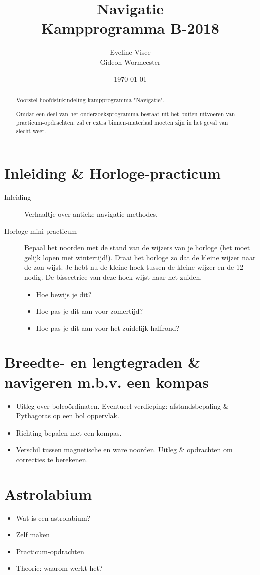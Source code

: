 \documentclass[a4paper,10pt]{article}
\title{Navigatie \\ Kampprogramma B-2018}
\author{Eveline Visee \\ Gideon Wormeester}
\date{\today}
\begin{document}
\maketitle

\begin{abstract}
Voorstel hoofdstukindeling kampprogramma "Navigatie".

Omdat een deel van het onderzoeksprogramma bestaat uit het buiten uitvoeren van practicum-opdrachten, zal er extra binnen-materiaal moeten zijn in het geval van slecht weer.
\end{abstract}

\section{Inleiding \& Horloge-practicum} \label{horloge}
\begin{description}
 \item [Inleiding] Verhaaltje over antieke navigatie-methodes.
 \item [Horloge mini-practicum] Bepaal het noorden met de stand van de wijzers van je horloge (het moet gelijk lopen met wintertijd!). Draai het horloge zo dat de kleine wijzer naar de zon wijst. Je hebt nu de kleine hoek tussen de kleine wijzer en de 12 nodig. De bissectrice van deze hoek wijst naar het zuiden. 
 \begin{itemize}
  \item Hoe bewijs je dit?
  \item Hoe pas je dit aan voor zomertijd?
  \item Hoe pas je dit aan voor het zuidelijk halfrond?
 \end{itemize}
\end{description}

\section{Breedte- en lengtegraden \& navigeren m.b.v. een kompas} \label{bol}
\begin{itemize}
 \item Uitleg over bolco\"ordinaten. Eventueel verdieping: afstandsbepaling \& Pythagoras op een bol oppervlak.
 \item Richting bepalen met een kompas.
 \item Verschil tussen magnetische en ware noorden. Uitleg \& opdrachten om correcties te berekenen.
\end{itemize}

\section{Astrolabium} \label{astrolabium}
\begin{itemize}
\item Wat is een astrolabium?
\item Zelf maken
\item Practicum-opdrachten
\item Theorie: waarom werkt het?
\end{itemize}
\end{document}
